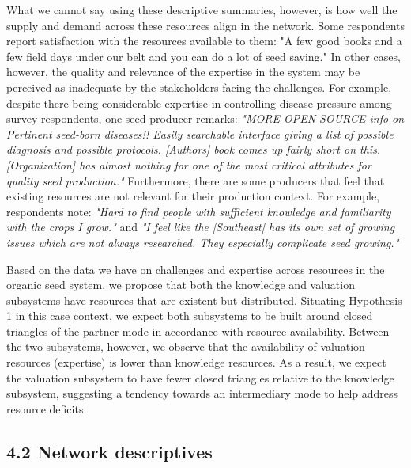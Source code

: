 \documentclass[twoside,12pt,final]{ucthesis-CA2012}
\begin{document}
\begin{ucmainmatter}
What we cannot say using these descriptive summaries, however, is how
well the supply and demand across these resources align in the network.
Some respondents report satisfaction with the resources available to
them: "A few good books and a few field days under our belt and you can
do a lot of seed saving." In other cases, however, the quality and
relevance of the expertise in the system may be perceived as inadequate
by the stakeholders facing the challenges. For example, despite there
being considerable expertise in controlling disease pressure among
survey respondents, one seed producer remarks: \emph{"MORE OPEN-SOURCE info
on Pertinent seed-born diseases!! Easily searchable interface giving a
list of possible diagnosis and possible protocols. {[}Author\textquotesingle s{]} book
comes up fairly short on this. {[}Organization{]} has almost nothing for
one of the most critical attributes for quality seed production."}
Furthermore, there are some producers that feel that existing resources
are not relevant for their production context. For example, respondents
note: \emph{"Hard to find people with sufficient knowledge and familiarity
with the crops I grow."} and \emph{"I feel like the {[}Southeast{]} has its
own set of growing issues which are not always researched. They
especially complicate seed growing."}

Based on the data we have on challenges and expertise across resources
in the organic seed system, we propose that both the knowledge and
valuation subsystems have resources that are existent but distributed.
Situating Hypothesis 1 in this case context, we expect both subsystems
to be built around closed triangles of the partner mode in accordance
with resource availability. Between the two subsystems, however, we
observe that the availability of valuation resources (expertise) is
lower than knowledge resources. As a result, we expect the valuation
subsystem to have fewer closed triangles relative to the knowledge
subsystem, suggesting a tendency towards an intermediary mode to help
address resource deficits.

\hypertarget{network-descriptives}{%
\subsection{4.2 Network descriptives}\label{network-descriptives}}


\end{ucmainmatter}
\end{document}
